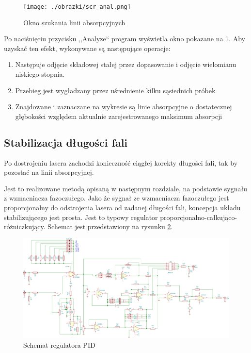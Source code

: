 \documentclass[a4paper,10pt]{article}
\begin{document}
\begin{figure}
\begin{center}
 \texttt{[image: ./obrazki/scr\_anal.png]}
\end{center}
\caption{Okno szukania linii absorpcyjnych}
\label{scr-anal}
\end{figure}

Po naciśnięciu przycisku ,,Analyze`` program wyświetla okno pokazane na \ref{scr-anal}.
Aby uzyskać ten efekt, wykonywane są następujące operacje:
\begin{enumerate}
 \item Następuje odjęcie składowej stałej przez dopasowanie i odjęcie wielomianu niskiego stopnia.
 \item Przebieg jest wygładzany przez uśrednienie kilku sąsiednich próbek
 \item Znajdowane i zaznaczane na wykresie są linie absorpcyjne o dostatecznej głębokości względem aktualnie zarejestrowanego maksimum absorpcji
\end{enumerate}





\subsection{Stabilizacja długości fali}

Po dostrojeniu lasera zachodzi konieczność ciągłej korekty długości fali, tak by pozostać na linii absorpcyjnej.

Jest to realizowane metodą opisaną w następnym rozdziale, na podstawie sygnału z wzmacniacza fazoczułego. %
Jako że sygnał ze wzmacniacza fazoczułego jest proporcjonalny do odstrojenia lasera od zadanej długości fali, koncepcja układu stabilizującego jest prosta.
Jest to typowy regulator proporcjonalno-całkująco-różniczkujący. Schemat jest przedstawiony na rysunku \ref{sch-pid}.

\begin{figure}
\begin{center}
 \includegraphics[scale=0.58, angle =90 ]{./obrazki/pidella.pdf}
\end{center}
\caption{Schemat regulatora PID}
\label{sch-pid}
\end{figure}
\end{document}
